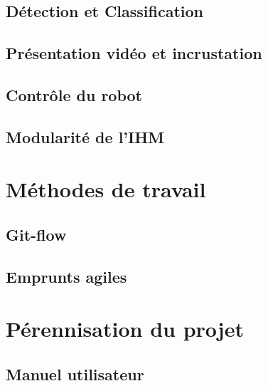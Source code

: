 
		\subsection{Détection et Classification}
		
			
		\subsection{Présentation vidéo et incrustation}
		
			
		\subsection{Contrôle du robot}
		
			
		\subsection{Modularité de l'IHM}
		
			
	\section{Méthodes de travail}

		\subsection{Git-flow}
		
			
		\subsection{Emprunts agiles}
		
			

	\section{Pérennisation du projet}
	
		\subsection{Manuel utilisateur}
		
